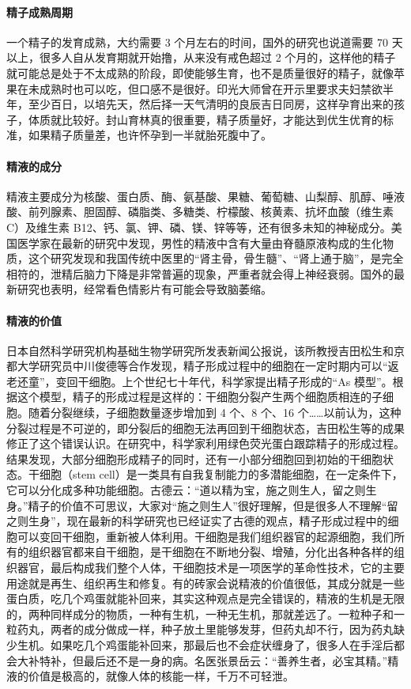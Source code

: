 \paragraph{精子成熟周期}

一个精子的发育成熟，大约需要 3 个月左右的时间，国外的研究也说道需要 70 天以上，很多人自从发育期就开始撸，从来没有戒色超过 2 个月的，这样他的精子就可能总是处于不太成熟的阶段，即使能够生育，也不是质量很好的精子，就像苹果在未成熟时也可以吃，但口感不是很好。印光大师曾在开示里要求夫妇禁欲半年，至少百日，以培先天，然后择一天气清明的良辰吉日同房，这样孕育出来的孩子，体质就比较好。封山育林真的很重要，精子质量好，才能达到优生优育的标准，如果精子质量差，也许怀孕到一半就胎死腹中了。

\paragraph{精液的成分}

精液主要成分为核酸、蛋白质、酶、氨基酸、果糖、葡萄糖、山梨醇、肌醇、唾液酸、前列腺素、胆固醇、磷脂类、多糖类、柠檬酸、核黄素、抗坏血酸（维生素 C）及维生素 B12、钙、氯、钾、磷、镁、锌等等，还有很多未知的神秘成分。美国医学家在最新的研究中发现，男性的精液中含有大量由脊髓原液构成的生化物质，这个研究发现和我国传统中医里的“肾主骨，骨生髓”、“肾上通于脑”，是完全相符的，泄精后脑力下降是非常普遍的现象，严重者就会得上神经衰弱。国外的最新研究也表明，经常看色情影片有可能会导致脑萎缩。

\paragraph{精液的价值}

日本自然科学研究机构基础生物学研究所发表新闻公报说，该所教授吉田松生和京都大学研究员中川俊德等合作发现，精子形成过程中的细胞在一定时期内可以“返老还童”，变回干细胞。上个世纪七十年代，科学家提出精子形成的“As 模型”。根据这个模型，精子的形成过程是这样的：干细胞分裂产生两个细胞质相连的子细胞。随着分裂继续，子细胞数量逐步增加到 4 个、8 个、16 个……以前认为，这种分裂过程是不可逆的，即分裂后的细胞无法再回到干细胞状态，吉田松生等的成果修正了这个错误认识。在研究中，科学家利用绿色荧光蛋白跟踪精子的形成过程。结果发现，大部分细胞形成精子的同时，还有一小部分细胞回到初始的干细胞状态。干细胞（stem cell）是一类具有自我复制能力的多潜能细胞，在一定条件下，它可以分化成多种功能细胞。古德云：“道以精为宝，施之则生人，留之则生身。”精子的价值不可思议，大家对“施之则生人”很好理解，但是很多人不理解“留之则生身”，现在最新的科学研究也已经证实了古德的观点，精子形成过程中的细胞可以变回干细胞，重新被人体利用。干细胞是我们组织器官的起源细胞，我们所有的组织器官都来自干细胞，是干细胞在不断地分裂、增殖，分化出各种各样的组织器官，最后构成我们整个人体，干细胞技术是一项医学的革命性技术，它的主要用途就是再生、组织再生和修复。有的砖家会说精液的价值很低，其成分就是一些蛋白质，吃几个鸡蛋就能补回来，其实这种观点是完全错误的，精液的生机是无限的，两种同样成分的物质，一种有生机，一种无生机，那就差远了。一粒种子和一粒药丸，两者的成分做成一样，种子放土里能够发芽，但药丸却不行，因为药丸缺少生机。如果吃几个鸡蛋能补回来，那最后也不会症状缠身了，很多人在手淫后都会大补特补，但最后还不是一身的病。名医张景岳云：“善养生者，必宝其精。”精液的价值是极高的，就像人体的核能一样，千万不可轻泄。

